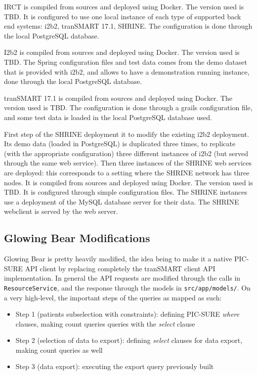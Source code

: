 IRCT is compiled from sources and deployed using Docker.
The version used is TBD.
It is configured to use one local instance of each type of supported back end systems: i2b2, tranSMART 17.1, SHRINE.
The configuration is done through the local PostgreSQL database.

I2b2 is compiled from sources and deployed using Docker.
The version used is TBD.
The Spring configuration files and test data comes from the demo dataset that is provided with i2b2, and allows to have a demonstration running instance, done through the local PostgreSQL database.

tranSMART 17.1 is compiled from sources and deployed using Docker.
The version used is TBD.
The configuration is done through a grails configuration file, and some test data is loaded in the local PostgreSQL database used.

First step of the SHRINE deployment it to modify the existing i2b2 deployment.
Its demo data (loaded in PostgreSQL) is duplicated three times, to replicate (with the appropriate configuration) three different instances of i2b2 (but served through the same web service).
Then three instances of the SHRINE web services are deployed: this corresponds to a setting where the SHRINE network has three nodes.
It is compiled from sources and deployed using Docker. 
The version used is TBD.
It is configured through simple configuration files.
The SHRINE instances use a deployment of the MySQL database server for their data.
The SHRINE webclient is served by the web server.

\subsection{Glowing Bear Modifications}

Glowing Bear is pretty heavily modified, the idea being to make it a native PIC-SURE API client by replacing completely the tranSMART client API implementation. 
In general the API requests are modified through the calls in \verb|ResourceService|, and the response through the models in \verb|src/app/models/|.
On a very high-level, the important steps of the queries as mapped as such:
\begin{itemize}
    \item Step 1 (patients subselection with constraints): defining PIC-SURE \emph{where} clauses, making count queries queries with the \emph{select} clause
    \item Step 2 (selection of data to export): defining \emph{select} clauses for data export, making count queries as well
    \item Step 3 (data export): executing the export query previously built
\end{itemize}

